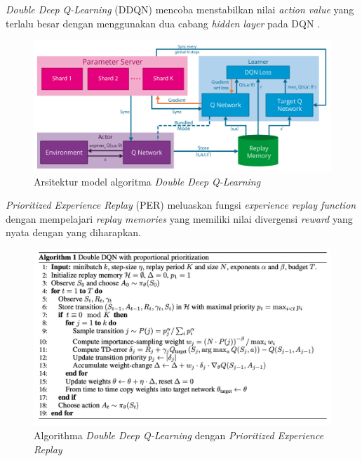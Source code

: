 \emph{Double Deep Q-Learning} (DDQN) mencoba menstabilkan nilai \emph{action value} yang terlalu besar dengan menggunakan dua cabang \emph{hidden layer} pada DQN \citep{doubleDQN}.

\begin{figure}[H]
  \centering
    \includegraphics[scale=0.2]{gambar/ddqn_architecture.png}
    \caption{Arsitektur model algoritma \emph{Double Deep Q-Learning}}
    \label{fig:ddqnArchitecture}
\end{figure}

\emph{Prioritized Experience Replay} (PER) meluaskan fungsi \emph{experience replay function} dengan mempelajari \emph{replay memories} yang memiliki nilai divergensi \emph{reward} yang nyata dengan yang diharapkan.\citep{prioritizedER}

\begin{figure}[H]
  \centering
    \includegraphics[scale=0.3]{gambar/ddqn_per_algorithm.png}
    \caption{Algorithma \emph{Double Deep Q-Learning} dengan \emph{Prioritized Experience Replay}}
    \label{fig:dqnPerAlgorithm}
\end{figure}

